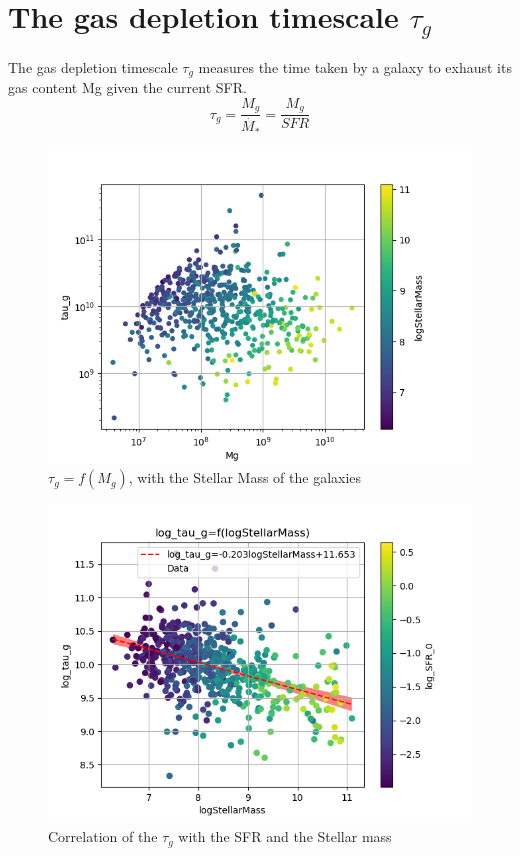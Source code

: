 \documentclass[a4paper,twocolumn]{article}
\begin{document}
\section{The gas depletion timescale \(\tau_g\)}
\label{sec:org33bc00a}

The gas depletion timescale \(\tau_g\) measures the time taken by a galaxy to exhaust its gas content Mg given the current SFR\autocites{nageshSimulationsStarformingMainsequence2023}[][]{pflamm-altenburgFundamentalGasDepletion2009}.
$$
\tau_g=\frac{M_g}{\dot{M_*}}=\frac{M_g}{SFR}
$$

\begin{figure}[htbp]
\centering
\includegraphics[width=.9\linewidth]{./figs/tau_g-Mg-color_StellarMass.png}
\caption{\label{fig:$\tau_g = f(M_g)$, with the Stellar Mass of the galaxies}\(\tau_g = f(M_g)\), with the Stellar Mass of the galaxies}
\end{figure}

\begin{figure}[htbp]
\centering
\includegraphics[width=.9\linewidth]{./figs/logStellarMass-log_tau_g-color_log_SFR_0.png}
\caption{\label{fig:Correlation of the $\tau_g$ with the SFR and the Stellar mass}Correlation of the \(\tau_g\) with the SFR and the Stellar mass}
\end{figure}
\end{document}
